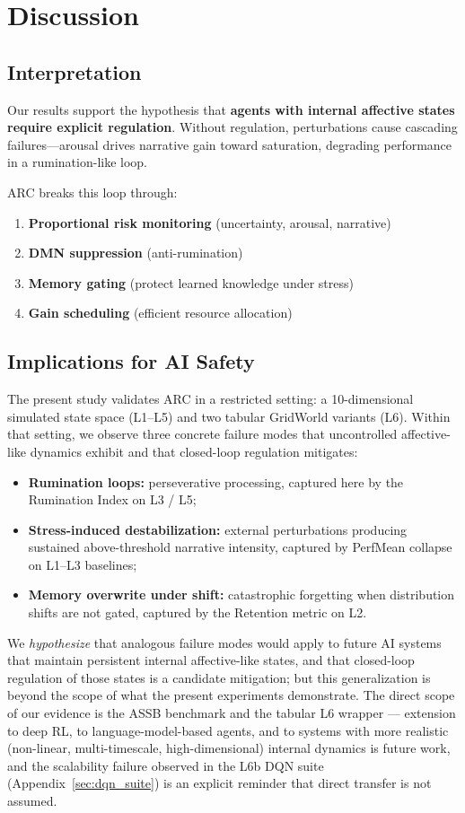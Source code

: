\documentclass{article}
\begin{document}
\section{Discussion}

\subsection{Interpretation}

Our results support the hypothesis that \textbf{agents with internal affective states require explicit regulation}. Without regulation, perturbations cause cascading failures---arousal drives narrative gain toward saturation, degrading performance in a rumination-like loop.

ARC breaks this loop through:
\begin{enumerate}
    \item \textbf{Proportional risk monitoring} (uncertainty, arousal, narrative)
    \item \textbf{DMN suppression} (anti-rumination)
    \item \textbf{Memory gating} (protect learned knowledge under stress)
    \item \textbf{Gain scheduling} (efficient resource allocation)
\end{enumerate}

\subsection{Implications for AI Safety}

The present study validates ARC in a restricted setting: a 10-dimensional simulated state space (L1--L5) and two tabular GridWorld variants (L6). Within that setting, we observe three concrete failure modes that uncontrolled affective-like dynamics exhibit and that closed-loop regulation mitigates:
\begin{itemize}
    \item \textbf{Rumination loops:} perseverative processing, captured here by the Rumination Index on L3 / L5;
    \item \textbf{Stress-induced destabilization:} external perturbations producing sustained above-threshold narrative intensity, captured by PerfMean collapse on L1--L3 baselines;
    \item \textbf{Memory overwrite under shift:} catastrophic forgetting when distribution shifts are not gated, captured by the Retention metric on L2.
\end{itemize}
We \emph{hypothesize} that analogous failure modes would apply to future AI systems that maintain persistent internal affective-like states, and that closed-loop regulation of those states is a candidate mitigation; but this generalization is beyond the scope of what the present experiments demonstrate. The direct scope of our evidence is the ASSB benchmark and the tabular L6 wrapper --- extension to deep RL, to language-model-based agents, and to systems with more realistic (non-linear, multi-timescale, high-dimensional) internal dynamics is future work, and the scalability failure observed in the L6b DQN suite (Appendix~\ref{sec:dqn_suite}) is an explicit reminder that direct transfer is not assumed.
\end{document}
